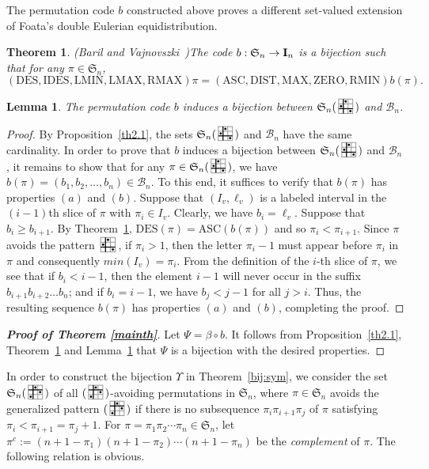 \documentclass[12pt]{amsart}
\newcounter{mycount}
\theoremstyle{plain}
\newtheorem{theorem}[mycount]{Theorem}
\newtheorem{lemma}[mycount]{Lemma}
\theoremstyle{definition}
\theoremstyle{example}
\theoremstyle{remark}
\numberwithin{equation}{section}
\numberwithin{figure}{section}
\def\I{\operatorname{{\bf I}}}
\def\B{ \mathcal{B}}
\def\IDES{\mathrm{IDES}}
\def\DES{\mathrm{DES}}
\def\RMAX{\mathrm{RMAX}}
\def\LMAX{\mathrm{LMAX}}
\def\LMIN{\mathrm{LMIN}}
\def\DIST{\mathrm{DIST}}
\def\ASC{\mathrm{ASC}}
\def\RMIN{\mathrm{RMIN}}
\def\ZERO{\mathrm{ZERO}}
\def\MAX{\mathrm{MAX}}
\def\S{\mathfrak{S}}
\newcommand{\PATTERN}{
    \draw[step=1, xshift=14pt, yshift=14pt, \cfill, line cap=round] (0,0) grid (3,3);
    \draw[step=1, xshift=14pt, yshift=14pt, thick] (0,2) -- (3,2);
    \draw[step=1, xshift=14pt, yshift=14pt, thick] (1,0) -- (1,3);
    \foreach \x/\y in {1/1,2/3,3/2} \node[disc, fill=black] at (\x,\y) {};
}
\newcommand{\SEPATTERN}{
    \draw[step=1, xshift=14pt, yshift=14pt, \cfill, line cap=round] (0,0) grid (3,3);
    \draw[step=1, xshift=14pt, yshift=14pt, thick] (0,1) -- (3,1);
    \draw[step=1, xshift=14pt, yshift=14pt, thick] (1,0) -- (1,3);
    \foreach \x/\y in {1/2,2/3,3/1} \node[disc, fill=black] at (\x,\y) {};
}
\newcommand{\pattern}{\!\raisebox{-0.3em}{
  \begin{tikzpicture}[line width=0.7pt, scale=0.15]
    \tikzstyle{disc} = [circle,thin,draw=black, minimum size=1.7pt, inner sep=0pt ]
    \PATTERN
  \end{tikzpicture}}
}
\newcommand{\sepattern}{\!\raisebox{-0.3em}{
  \begin{tikzpicture}[line width=0.7pt, scale=0.15]
    \tikzstyle{disc} = [circle,thin,draw=black, minimum size=1.7pt, inner sep=0pt ]
    \SEPATTERN
  \end{tikzpicture}}
}
\newcommand{\cfill}{black!40}
\begin{document}
The permutation code $b$ constructed above proves a different set-valued extension of Foata's double Eulerian equidistribution.
\begin{theorem}{ \upshape   (Baril and Vajnovszki~\cite{bv})}\label{th2.3}
The code $b: \S_n\rightarrow\I_n$ is a bijection  such  that  for any $\pi\in\S_n$,
 $$
 (\DES, \IDES, \LMIN,  \LMAX, \RMAX)\pi=(\ASC, \DIST, \MAX,  \ZERO, \RMIN)b(\pi).
 $$
\end{theorem}


\begin{lemma}\label{th2.4}
 The permutation code $b$ induces a bijection between  $\S_n(\sepattern\,)$ and $\B_n$.
\end{lemma}
\begin{proof}
 By Proposition~\ref{th2.1}, the sets $\S_n(\sepattern\,)$ and $\mathcal{B}_n$ have the same cardinality. In order to prove that  $b$ induces a bijection between  $\S_n(\sepattern\,)$ and $\mathcal{B}_n$,  it remains to show that  for any $\pi\in\S_n(\sepattern\,)$, we have $b(\pi)=(b_1,b_2,\ldots, b_n)\in \mathcal{B}_n$.
To this end, it suffices to verify that $b(\pi)$ has properties $(a)$ and $(b)$.
Suppose that  $(I_v, \ell_v )$ is a labeled interval in the $(i-1)$th slice of $\pi$ with $\pi_i\in I_v $.  Clearly, we have $b_i=\ell_v$. Suppose that $b_i\geq b_{i+1}$.  By Theorem~\ref{th2.3}, $\DES(\pi)=\ASC(b(\pi))$ and so $\pi_i< \pi_{i+1}$. Since $\pi$ avoids the pattern $\sepattern\,$, if $\pi_i>1$, then the letter $\pi_i-1$ must appear before $\pi_i$ in $\pi$ and consequently  $min(I_v)=\pi_i$. From the definition of the $i$-th slice of $\pi$, we see that  if $b_i<i-1$, then  the element $i-1$ will never occur in the suffix $b_{i+1}b_{i+2}\ldots b_n$;  and if $b_i=i-1$, we have $b_j<j-1$ for all $j>i$. Thus, the resulting sequence $b(\pi)$ has properties $(a)$ and $(b)$, completing the proof.
\end{proof}


\begin{proof}[{\bf Proof of Theorem \ref{mainth}}] Let $\Psi=\beta \circ b$.  It follows from Proposition~\ref{th2.1}, Theorem~\ref{th2.3} and Lemma~\ref{th2.4} that $\Psi$ is a bijection with the desired properties.
\end{proof}


In order to construct the bijection $\Upsilon$ in Theorem~\ref{bij:sym}, we consider the set $\S_n(\pattern\,)$ of  all $(\pattern\,)$-avoiding permutations in $\S_n$, where $\pi\in\S_n$ avoids the generalized pattern $(\pattern\,)$ if there is no subsequence  $\pi_i\pi_{i+1}\pi_j$ of $\pi$ satisfying $\pi_i<\pi_{i+1}=\pi_j+1$. For $\pi=\pi_1\pi_2\cdots\pi_n\in\S_n$, let $\pi^c:=(n+1-\pi_1)(n+1-\pi_2)\cdots(n+1-\pi_n)$ be the {\em complement} of $\pi$. The following relation is obvious.
\end{document}
